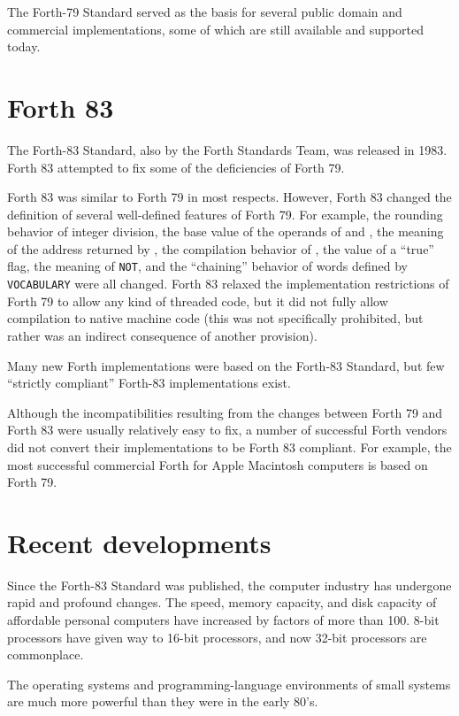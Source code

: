 The Forth-79 Standard served as the basis for several public domain
and commercial implementations, some of which are still available and
supported today.


\section{Forth 83} %

The Forth-83 Standard, also by the Forth Standards Team, was released
in 1983. Forth 83 attempted to fix some of the deficiencies of Forth
79.

Forth 83 was similar to Forth 79 in most respects. However, Forth 83
changed the definition of several well-defined features of Forth 79.
For example, the rounding behavior of integer division, the base value
of the operands of  and , the meaning of the
address returned by , the compilation behavior of ,
the value of a ``true'' flag, the meaning of \texttt{NOT}, and the
``chaining'' behavior of words defined by \texttt{VOCABULARY} were all
changed. Forth 83 relaxed the implementation restrictions of Forth 79
to allow any kind of threaded code, but it did not fully allow
compilation to native machine code (this was not specifically prohibited,
but rather was an indirect consequence of another provision).

Many new Forth implementations were based on the Forth-83 Standard, but
few ``strictly compliant'' Forth-83 implementations exist.

Although the incompatibilities resulting from the changes between
Forth 79 and Forth 83 were usually relatively easy to fix, a number
of successful Forth vendors did not convert their implementations to
be Forth 83 compliant. For example, the most successful commercial
Forth for Apple Macintosh computers is based on Forth 79.

\section{Recent developments} %

Since the Forth-83 Standard was published, the computer industry has
undergone rapid and profound changes. The speed, memory capacity, and
disk capacity of affordable personal computers have increased by
factors of more than 100. 8-bit processors have given way to 16-bit
processors, and now 32-bit processors are commonplace.

The operating systems and programming-language environments of small
systems are much more powerful than they were in the early 80's.

